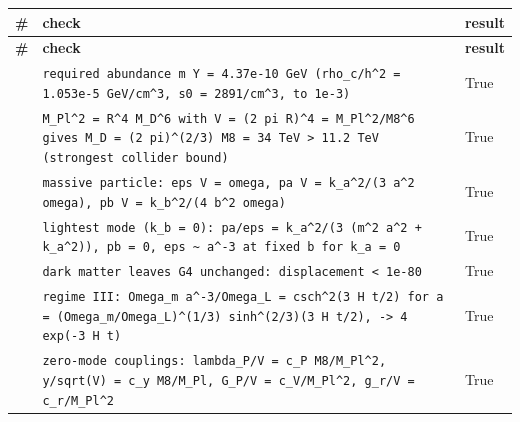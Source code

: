 \documentclass[10pt,a4paper]{article}
\begin{document}
{\footnotesize
\begin{longtable}{>{\raggedright\arraybackslash}p{}>{\raggedright\arraybackslash}p{}>{\raggedright\arraybackslash}p{}}
\toprule
\textbf{\#} & \textbf{check} & \textbf{result} \\
\midrule\endfirsthead
\toprule
\textbf{\#} & \textbf{check} & \textbf{result} \\
\midrule\endhead
\endfoot
\bottomrule\endlastfoot
1 & \texttt{required abundance m Y = 4.37e-10 GeV (rho\_\allowbreak{}c/\allowbreak{}h\textasciicircum{}2 = 1.053e-5 GeV/\allowbreak{}cm\textasciicircum{}3, s0 = 2891/\allowbreak{}cm\textasciicircum{}3, to 1e-3)} & True \\
2 & \texttt{M\_\allowbreak{}Pl\textasciicircum{}2 = R\textasciicircum{}4 M\_\allowbreak{}D\textasciicircum{}6 with V = (2 pi R)\textasciicircum{}4 = M\_\allowbreak{}Pl\textasciicircum{}2/\allowbreak{}M8\textasciicircum{}6 gives M\_\allowbreak{}D = (2 pi)\textasciicircum{}(2/\allowbreak{}3) M8 = 34 TeV > 11.2 TeV (strongest collider bound)} & True \\
3 & \texttt{massive particle: eps V = omega, pa V = k\_\allowbreak{}a\textasciicircum{}2/\allowbreak{}(3 a\textasciicircum{}2 omega), pb V = k\_\allowbreak{}b\textasciicircum{}2/\allowbreak{}(4 b\textasciicircum{}2 omega)} & True \\
4 & \texttt{lightest mode (k\_\allowbreak{}b = 0): pa/\allowbreak{}eps = k\_\allowbreak{}a\textasciicircum{}2/\allowbreak{}(3 (m\textasciicircum{}2 a\textasciicircum{}2 + k\_\allowbreak{}a\textasciicircum{}2)), pb = 0, eps \textasciitilde{} a\textasciicircum{}-3 at fixed b for k\_\allowbreak{}a = 0} & True \\
5 & \texttt{dark matter leaves G4 unchanged: displacement < 1e-80} & True \\
6 & \texttt{regime III: Omega\_\allowbreak{}m a\textasciicircum{}-3/\allowbreak{}Omega\_\allowbreak{}L = csch\textasciicircum{}2(3 H t/\allowbreak{}2) for a = (Omega\_\allowbreak{}m/\allowbreak{}Omega\_\allowbreak{}L)\textasciicircum{}(1/\allowbreak{}3) sinh\textasciicircum{}(2/\allowbreak{}3)(3 H t/\allowbreak{}2), -> 4 exp(-3 H t)} & True \\
7 & \texttt{zero-mode couplings: lambda\_\allowbreak{}P/\allowbreak{}V = c\_\allowbreak{}P M8/\allowbreak{}M\_\allowbreak{}Pl\textasciicircum{}2, y/\allowbreak{}sqrt(V) = c\_\allowbreak{}y M8/\allowbreak{}M\_\allowbreak{}Pl, G\_\allowbreak{}P/\allowbreak{}V = c\_\allowbreak{}V/\allowbreak{}M\_\allowbreak{}Pl\textasciicircum{}2, g\_\allowbreak{}r/\allowbreak{}V = c\_\allowbreak{}r/\allowbreak{}M\_\allowbreak{}Pl\textasciicircum{}2} & True \\

\end{longtable}}
\end{document}
